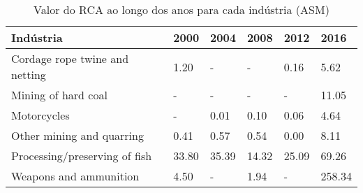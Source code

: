 \begin{table}
\centering
\caption{Valor do RCA ao longo dos anos para cada indústria (ASM)}
\label{tab:ex3-tempo-ASM}
\begin{tabular}{p{6cm}p{1.5cm}p{1.5cm}p{1.5cm}p{1.5cm}p{1.5cm}}
\toprule
                     Indústria &  2000 &  2004 &  2008 &  2012 &   2016 \\
\midrule
Cordage rope twine and netting &  1.20 &     - &     - &  0.16 &   5.62 \\
           Mining of hard coal &     - &     - &     - &     - &  11.05 \\
                   Motorcycles &     - &  0.01 &  0.10 &  0.06 &   4.64 \\
     Other mining and quarring &  0.41 &  0.57 &  0.54 &  0.00 &   8.11 \\
 Processing/preserving of fish & 33.80 & 35.39 & 14.32 & 25.09 &  69.26 \\
        Weapons and ammunition &  4.50 &     - &  1.94 &     - & 258.34 \\
\bottomrule
\end{tabular}
\end{table}
